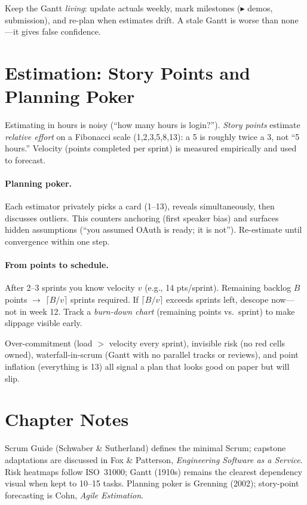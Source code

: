 Keep the Gantt \emph{living}: update actuals weekly, mark milestones ($\blacktriangleright$ demos, submission), and re-plan when estimates drift. A stale Gantt is worse than none---it gives false confidence.

\section{Estimation: Story Points and Planning Poker}
\label{sec:estimation}
Estimating in hours is noisy (``how many hours is login?''). \emph{Story points} estimate \emph{relative effort} on a Fibonacci scale (1,2,3,5,8,13): a 5 is roughly twice a 3, not ``5 hours.'' Velocity (points completed per sprint) is measured empirically and used to forecast.

\paragraph{Planning poker.} Each estimator privately picks a card (1--13), reveals simultaneously, then discusses outliers. This counters anchoring (first speaker bias) and surfaces hidden assumptions (``you assumed OAuth is ready; it is not''). Re-estimate until convergence within one step.

\paragraph{From points to schedule.} After 2--3 sprints you know velocity $v$ (e.g., 14 pts/sprint). Remaining backlog $B$ points $\to$ $\lceil B/v\rceil$ sprints required. If $\lceil B/v\rceil$ exceeds sprints left, descope now---not in week 12. Track a \emph{burn-down chart} (remaining points vs.\ sprint) to make slippage visible early.

\begin{remark}
Over-commitment (load $>$ velocity every sprint), invisible risk (no red cells owned), waterfall-in-scrum (Gantt with no parallel tracks or reviews), and point inflation (everything is 13) all signal a plan that looks good on paper but will slip.
\end{remark}

\section{Chapter Notes}
Scrum Guide (Schwaber \& Sutherland) defines the minimal Scrum; capstone adaptations are discussed in Fox \& Patterson, \emph{Engineering Software as a Service}. Risk heatmaps follow ISO~31000; Gantt (1910s) remains the clearest dependency visual when kept to 10--15 tasks. Planning poker is Grenning (2002); story-point forecasting is Cohn, \emph{Agile Estimation}.

